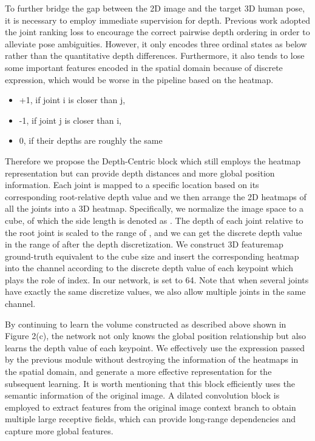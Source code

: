 \documentclass[letterpaper]{article} \usepackage{aaai21}  \usepackage{times}  \usepackage{helvet} \usepackage{courier}  \usepackage[hyphens]{url}  \usepackage{graphicx} \urlstyle{rm} \def\UrlFont{\rm}  \usepackage{natbib}  \usepackage{caption} \frenchspacing  \setlength{\pdfpagewidth}{8.5in}  \setlength{\pdfpageheight}{11in}
\begin{document}
To further bridge the gap between the 2D image and the target 3D human pose, it is necessary to employ immediate supervision for depth. Previous work \cite{pavlakos2018ordinal} adopted the joint ranking loss to encourage the correct pairwise depth ordering in order to alleviate pose ambiguities. However, it only encodes three ordinal states as below rather than the quantitative depth differences. Furthermore, it also tends to lose some important features encoded in the spatial domain because of discrete expression, which would be worse in the pipeline based on the heatmap.

\begin{itemize}[leftmargin = 50pt]
\item +1, if joint i is closer than j,
\item -1, if joint j is closer than i,
\item 0, if their depths are roughly the same 
\end{itemize}


Therefore we propose the Depth-Centric block which still employs the heatmap representation but can provide depth distances and more global position information. Each joint is mapped to a specific location based on its corresponding root-relative depth value and we then arrange the 2D heatmaps of all the joints into a 3D heatmap. Specifically, we normalize the image space to a cube, of which the side length is denoted as . The depth of each joint relative to the root joint is scaled to the range of , and we can get the discrete depth value in the range of  after the depth discretization. We construct 3D featuremap ground-truth equivalent to the cube size and insert the corresponding heatmap into the channel according to the discrete depth value of each keypoint which plays the role of index. In our network,  is set to 64. Note that when several joints have exactly the same discretize values, we also allow multiple joints in the same channel. 


By continuing to learn the volume constructed as described above shown in Figure 2(c), the network not only knows the global position relationship but also learns the depth value of each keypoint. We effectively use the expression passed by the previous module without destroying the information of the heatmaps in the spatial domain, and generate a more effective representation for the subsequent learning. It is worth mentioning that this block efficiently uses the semantic information of the original image. A dilated convolution block is employed to extract features from the original image context branch to obtain multiple large receptive fields, which can provide long-range dependencies and capture more global features.
\end{document}
